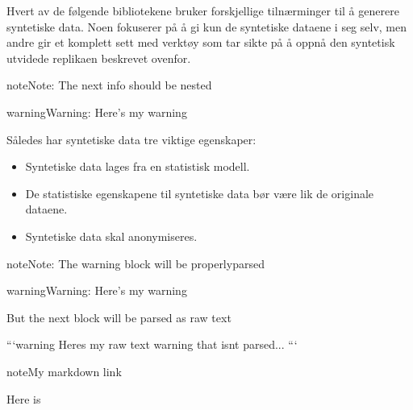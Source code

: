 \documentclass[letterpaper,10pt,english]{jupyterBook}
\begin{document}
\sphinxAtStartPar
Hvert av de følgende bibliotekene bruker forskjellige tilnærminger til å generere syntetiske data. Noen fokuserer på å gi kun de syntetiske dataene i seg selv, men andre gir et komplett sett med verktøy som tar sikte på å oppnå den syntetisk utvidede replikaen beskrevet ovenfor.

\begin{sphinxadmonition}{note}{Note:}
\sphinxAtStartPar
The next info should be nested

\begin{sphinxadmonition}{warning}{Warning:}
\sphinxAtStartPar
Here’s my warning
\end{sphinxadmonition}
\end{sphinxadmonition}

\sphinxAtStartPar
Således har syntetiske data tre viktige egenskaper:
\begin{itemize}
\item {} 
\sphinxAtStartPar
Syntetiske data lages fra en statistisk modell.

\item {} 
\sphinxAtStartPar
De statistiske egenskapene til syntetiske data bør være lik de originale dataene.

\item {} 
\sphinxAtStartPar
Syntetiske data skal anonymiseres.

\end{itemize}

\begin{sphinxadmonition}{note}{Note:}
\sphinxAtStartPar
The warning block will be properly\sphinxhyphen{}parsed

\begin{sphinxadmonition}{warning}{Warning:}
\sphinxAtStartPar
Here’s my warning
\end{sphinxadmonition}

\sphinxAtStartPar
But the next block will be parsed as raw text

\begin{sphinxVerbatim}[commandchars=\\\{\}]
```\PYGZob{}warning\PYGZcb{}
Here\PYGZsq{}s my raw text warning that isn\PYGZsq{}t parsed...
```
\end{sphinxVerbatim}
\end{sphinxadmonition}

\begin{sphinxadmonition}{note}{My markdown link}

\sphinxAtStartPar
Here is 
\end{sphinxadmonition}
\end{document}
